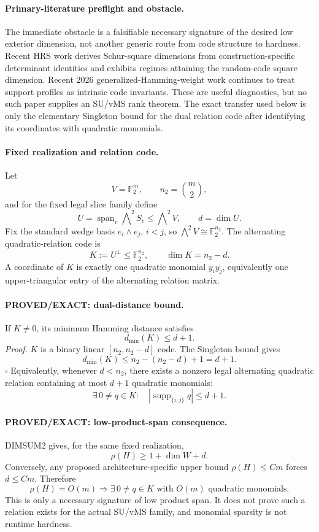 \documentclass[11pt]{article}
\begin{document}
\paragraph{Primary-literature preflight and obstacle.}
The immediate obstacle is a falsifiable necessary signature of the desired low exterior dimension, not another generic route from code structure to hardness. Recent HRS work derives Schur-square dimensions from construction-specific determinant identities and exhibits regimes attaining the random-code square dimension. Recent 2026 generalized-Hamming-weight work continues to treat support profiles as intrinsic code invariants. These are useful diagnostics, but no such paper supplies an SU/vMS rank theorem. The exact transfer used below is only the elementary Singleton bound for the dual relation code after identifying its coordinates with quadratic monomials.

\paragraph{Fixed realization and relation code.}
Let
\[
V=\mathbb F_2^m,\qquad n_2=\binom m2,
\]
and for the fixed legal slice family define
\[
U=\operatorname{span}_v\bigwedge\nolimits^2S_v\le\bigwedge\nolimits^2V,\qquad d=\dim U.
\]
Fix the standard wedge basis \(e_i\wedge e_j\), \(i<j\), so \(\bigwedge^2V\cong\mathbb F_2^{n_2}\). The alternating quadratic-relation code is
\[
K:=U^\perp\le\mathbb F_2^{n_2},
\qquad \dim K=n_2-d.
\]
A coordinate of \(K\) is exactly one quadratic monomial \(y_i y_j\), equivalently one upper-triangular entry of the alternating relation matrix.

\paragraph{PROVED/EXACT: dual-distance bound.}
If \(K\ne0\), its minimum Hamming distance satisfies
\[
\boxed{d_{\min}(K)\le d+1.}
\]
\emph{Proof.} \(K\) is a binary linear \([n_2,n_2-d]\) code. The Singleton bound gives
\[
d_{\min}(K)\le n_2-(n_2-d)+1=d+1.
\]
\(\square\)
Equivalently, whenever \(d<n_2\), there exists a nonzero legal alternating quadratic relation containing at most \(d+1\) quadratic monomials:
\[
\boxed{\exists\,0\ne q\in K:\quad |\operatorname{supp}_{\{i,j\}}q|\le d+1.}
\]

\paragraph{PROVED/EXACT: low-product-span consequence.}
DIMSUM2 gives, for the same fixed realization,
\[
\rho(H)\ge 1+\dim W+d.
\]
Conversely, any proposed architecture-specific upper bound \(\rho(H)\le C m\) forces \(d\le Cm\). Therefore
\[
\boxed{\rho(H)=O(m)\Longrightarrow
\exists\,0\ne q\in K\text{ with }O(m)\text{ quadratic monomials}.}
\]
This is only a necessary signature of low product span. It does not prove such a relation exists for the actual SU/vMS family, and monomial sparsity is not runtime hardness.
\end{document}
